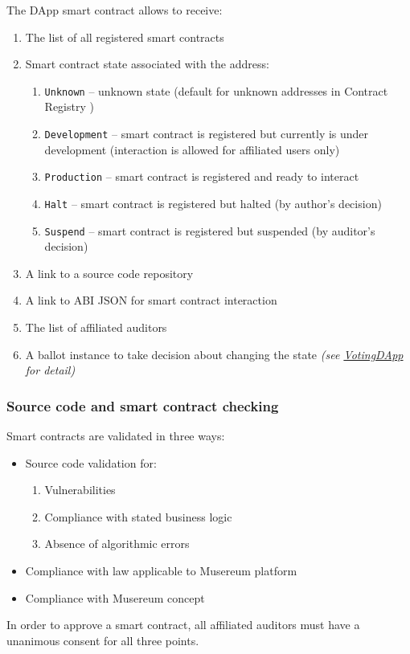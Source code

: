 \documentclass[12pt]{report}
\newcommand{\hlc}[1]{\colorbox{yellow!25}{#1}}
\def\code#1{\colorbox{light-gray}{\texttt{#1}}}
\begin{document}
The DApp smart contract allows to receive:
\begin{enumerate}
	\item The list of all registered smart contracts
	\item Smart contract state associated with the address:
	\begin{enumerate}
		\item \code{Unknown} – unknown state (default for unknown addresses in \hlc{Contract Registry })
		\item \code{Development} – smart contract is registered but currently is under development (interaction is allowed for affiliated users only)
		\item \code{Production} – smart contract is registered and \hlc{ready to interact}
		\item \code{Halt} – smart contract is registered but halted (by author's decision)
		\item \code{Suspend} – smart contract is registered but suspended (by auditor's decision)
	\end{enumerate}
\item A link to a source code repository
\item A link to ABI JSON for smart contract interaction
\item The list of affiliated auditors
\item A ballot \hlc{instance} to take decision about changing the state \textit{(see \hyperref[tech-apps-voting]{VotingDApp} for detail)}
\end{enumerate}
\subsubsection{Source code and smart contract checking}
\label{tech-apps-contracts-validate}
Smart contracts are validated in three ways:
\begin{itemize}
	\item Source code validation for:
		\begin{enumerate}
			\item Vulnerabilities 
			\item Compliance with stated business logic
			\item Absence of algorithmic errors
		\end{enumerate}
	\item Compliance with law applicable to Musereum platform
	\item Compliance with Musereum concept
\end{itemize}
In order to approve a smart contract, all affiliated auditors must have a unanimous consent for all three points.
\end{document}
